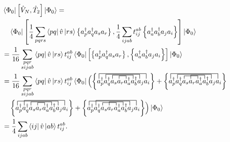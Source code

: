     \begin{align*}
        & \bra{\Phi_0} \left[ \hat{V}_N, \hat{T}_2 \right] \ket{\Phi_0}= \\
            & \quad \bra{\Phi_0}
                \left[ \frac{1}{4} \sum_{pqrs} \bra{pq}\hat{v}\ket{rs} \normord{a^\dagger_p a^\dagger_q a_s  a_r},
                    \frac{1}{4}\sum_{ijab} t_{ij}^{ab} \normord{a^\dagger_a a^\dagger_b a_j a_i} \right] \ket{\Phi_0} \\ 
            &= \frac{1}{16}\sum_{\substack{
                    pqr \\
                    sijab}} \bra{pq}\hat{v}\ket{rs}t_{ij}^{ab} \bra{\Phi_0} 
                \left[ \normord{a^\dagger_p a^\dagger_q a_s  a_r}, \normord{a^\dagger_a a^\dagger_b a_j a_i} \right]
                \ket{\Phi_0} \\ 
            &= \frac{1}{16}\sum_{\substack{
                    pqr \\
                    sijab}} \bra{pq}\hat{v}\ket{rs}t_{ij}^{ab} \bra{\Phi_0}
            \Bigl(
            \left\{
            \contraction{a^\dagger_p a^\dagger_q a_s}{a}{{}_r}{a}
            \contraction[1.25ex]{a^\dagger_p a^\dagger_q}{a}{{}_s a_r a^\dagger_a}{a}
            \contraction[1.50ex]{a^\dagger_p}{a}{{}^\dagger_q a_s a_r a^\dagger_a a^\dagger_b}{a}
            \contraction[1.75ex]{}{a}{{}^\dagger_p a^\dagger_q a_s a_r a^\dagger_a a^\dagger_b a_j}{a}
            a^\dagger_p a^\dagger_q a_s  a_r a^\dagger_a a^\dagger_b a_j a_i \right\}
            + \left\{
            \contraction{a^\dagger_p a^\dagger_q}{a}{{}_s a_r}{a}
            \contraction[1.25ex]{a^\dagger_p a^\dagger_q a_s}{a}{{}_r a^\dagger_p}{a}
            \contraction[1.50ex]{a^\dagger_p}{a}{{}^\dagger_q a_s a_r a^\dagger_a a^\dagger_b}{a}
            \contraction[1.75ex]{}{a}{{}^\dagger_p a^\dagger_q a_s a_r a^\dagger_a a^\dagger_b a_j}{a}
            a^\dagger_p a^\dagger_q a_s  a_r a^\dagger_a a^\dagger_b a_j a_i \right\} \\
            & \quad \left\{
            \contraction{a^\dagger_p a^\dagger_q a_s}{a}{{}_r}{a}
            \contraction[1.25ex]{a^\dagger_p a^\dagger_q}{a}{{}_s a_r a^\dagger_a}{a}
            \contraction[1.5ex]{}{a}{{}^\dagger_p a^\dagger_q a_s a_r a^\dagger_a a^\dagger_b}{a}
            \contraction[1.75ex]{a^\dagger_p}{a}{{}^\dagger_q a_s a_r a^\dagger_a a^\dagger_b a_j}{a}
            a^\dagger_p a^\dagger_q a_s  a_r a^\dagger_a a^\dagger_b a_j a_i \right\}
            + \left\{
            \contraction{a^\dagger_p a^\dagger_q}{a}{{}_s a_r}{a}
            \contraction[1.25ex]{a^\dagger_p a^\dagger_q a_s}{a}{{}_r a^\dagger_p}{a}
            \contraction[1.5ex]{}{a}{{}^\dagger_p a^\dagger_q a_s a_r a^\dagger_a a^\dagger_b}{a}
            \contraction[1.75ex]{a^\dagger_p}{a}{{}^\dagger_q a_s a_r a^\dagger_a a^\dagger_b a_j}{a}
            a^\dagger_p a^\dagger_q a_s  a_r a^\dagger_a a^\dagger_b a_j a_i \right\}
            \Bigr) \ket{\Phi_0} \\ 
            &= \frac{1}{4} \sum_{ijab} \bra{ij}\hat{v}\ket{ab} t_{ij}^{ab}.
    \end{align*}
